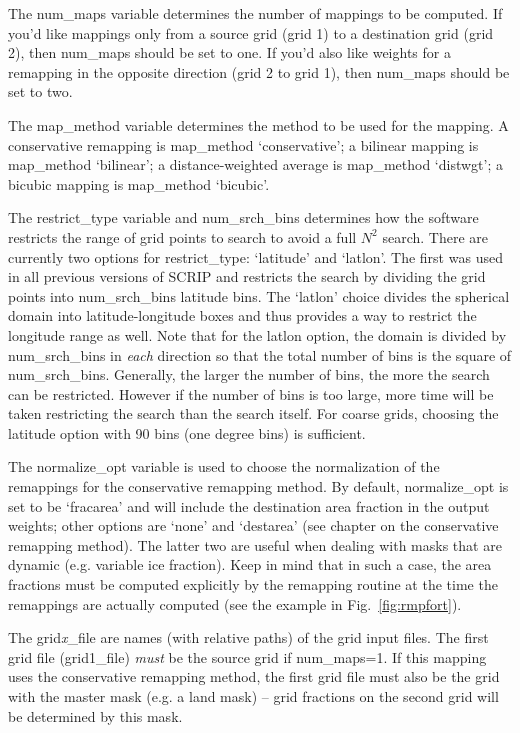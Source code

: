 \documentclass[12pt]{report}
\begin{document}
The num\_maps variable determines the number of mappings
to be computed.  If you'd like mappings only from a source
grid (grid 1) to a destination grid (grid 2), then
num\_maps should be set to one.  If you'd also like weights
for a remapping in the opposite direction (grid 2 to grid 1),
then num\_maps should be set to two.

The map\_method variable determines the method to be used
for the mapping.  A conservative remapping is map\_method
`conservative'; a bilinear mapping is map\_method `bilinear';
a distance-weighted average is map\_method `distwgt'; a
bicubic mapping is map\_method `bicubic'.

The restrict\_type variable and num\_srch\_bins determines
how the software restricts the range of grid points to search
to avoid a full $N^2$ search.  There are currently two options
for restrict\_type: `latitude' and `latlon'.  The first was used in
all previous versions of SCRIP and restricts the search by
dividing the grid points into num\_srch\_bins latitude bins.
The `latlon' choice divides the spherical domain into
latitude-longitude boxes and thus provides a way to
restrict the longitude range as well.  Note that for the latlon
option, the domain is divided by num\_srch\_bins in
{\em each} direction so that the total number of bins is the
square of num\_srch\_bins.  Generally, the larger the number
of bins, the more the search can be restricted.  However if
the number of bins is too large, more time will be taken
restricting the search than the search itself.  For coarse
grids, choosing the latitude option with 90 bins (one degree
bins) is sufficient.

The normalize\_opt variable is used to choose the normalization
of the remappings for the conservative remapping method.
By default, normalize\_opt is set to be `fracarea' and will
include the destination area fraction in the output weights;
other options are `none' and `destarea' (see chapter on the
conservative remapping method). The latter two are useful when
dealing with masks that are dynamic (e.g. variable ice fraction).
Keep in mind that in such a case, the
area fractions must be computed explicitly by the remapping
routine at the time the remappings are actually computed
(see the example in Fig.~\ref{fig:rmpfort}).

The grid{\em x}\_file are names (with relative paths) of
the grid input files.  The first grid file (grid1\_file)
{\em must} be the source grid if num\_maps=1.  If this
mapping uses the conservative remapping method, the first
grid file must also be the grid with the master mask
(e.g. a land mask) -- grid fractions on the second grid
will be determined by this mask.
\end{document}
